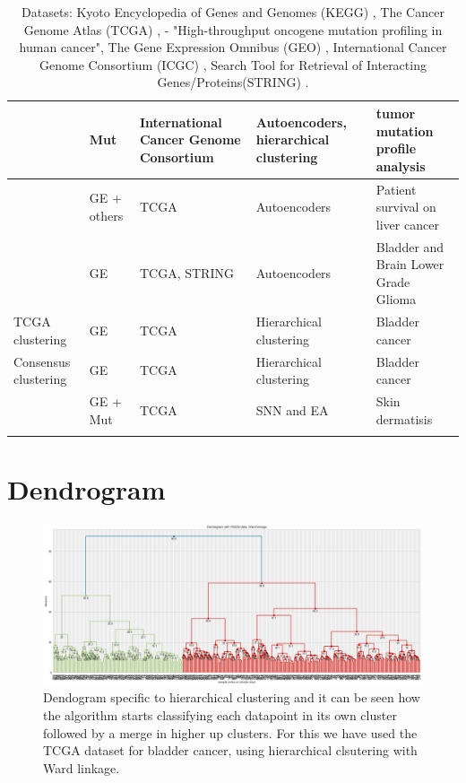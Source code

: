 \begin{appendices}
\begin{small}
\begin{longtable}[!h]{|p{2.0cm}|p{2.5cm}|p{3.5cm}|p{3.0cm}|p{5.5cm}|}
          \citet{Palazzo2019-hx} & Mut & International Cancer Genome Consortium & Autoencoders, hierarchical clustering & tumor mutation profile analysis \\ \hline
          \citet{Chaudhary2018-qj} & GE + others & TCGA & Autoencoders & Patient survival on liver cancer \\ \hline
          \citet{Ma2019-hk} & GE & TCGA, STRING & Autoencoders &  Bladder and Brain Lower Grade Glioma \\ \hline
          TCGA clustering & GE & TCGA & Hierarchical clustering & Bladder cancer  \\ \hline
          Consensus clustering & GE & TCGA & Hierarchical clustering & Bladder cancer \\ \hline
          \citet{Capecci2020-uj} & GE + Mut & TCGA & SNN and EA & Skin dermatisis  \\ \hline
      \caption{Datasets: Kyoto Encyclopedia of Genes and Genomes (KEGG) \cite{Kanehisa2017-wj}, The Cancer Genome Atlas (TCGA) \cite{Tcga2018-sj}, \citet{Thomas2007-yj} - "High-throughput oncogene mutation profiling in human cancer", The Gene Expression Omnibus (GEO) \cite{ Clough2016-zc, Davis2007-at}, International Cancer Genome Consortium (ICGC) \cite{International_Cancer_Genome_Consortium2010-ca}, Search Tool for Retrieval of Interacting Genes/Proteins(STRING) \cite{Szklarczyk2019-pu}. } 
      \label{tab:approaches}
      \end{longtable}
    \end{small}


\section{Dendrogram} \label{ap:dendogram}


\begin{figure}[!htb]                                  
    \centering\includegraphics[width=1.0\textwidth,height=1.0\textheight,keepaspectratio]{Images/Clustering/dendogram.png}
      \caption{Dendogram specific to hierarchical clustering and it can be seen how the algorithm starts classifying each datapoint in its own cluster followed by a merge in higher up clusters. For this we have used the TCGA dataset for bladder cancer, using hierarchical clsutering with Ward linkage.}
      \label{fig:dendogram}
  \end{figure}
  \FloatBarrier




\end{appendices}